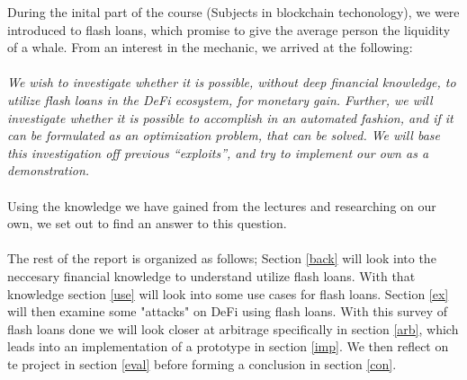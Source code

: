 During the inital part of the course (Subjects in blockchain techonology), we
were introduced to flash loans, which promise to give the average person the
liquidity of a whale. From an interest in the mechanic, we arrived at the
following:\\\\
\textit{We wish to investigate whether it is possible, without deep financial
knowledge, to utilize flash loans in the DeFi ecosystem, for monetary
gain. Further, we will investigate whether it is possible to accomplish in
an automated fashion, and if it can be formulated as an optimization
problem, that can be solved. We will base this investigation off previous
``exploits'', and try to implement our own as a demonstration.}\\\\
Using the knowledge we have gained from the lectures and researching on our own,
we set out to find an answer to this question.\\\\
The rest of the report is organized as follows; Section \ref{back}
will look into the neccesary financial knowledge to understand utilize
flash loans. With that knowledge section \ref{use} will look into some
use cases for flash loans. Section \ref{ex} will then examine some
"attacks" on DeFi using flash loans. With this survey of flash loans
done we will look closer at arbitrage specifically in section
\ref{arb}, which leads into an implementation of a prototype in
section \ref{imp}. We then reflect on te project in section \ref{eval}
before forming a conclusion in section \ref{con}.
